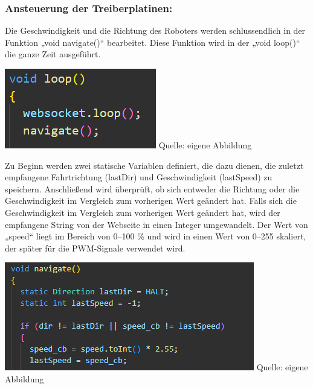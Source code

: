 \documentclass[ngerman,12pt,a4paper]{article}
\begin{document}
	\subsubsection{Ansteuerung der Treiberplatinen:}
	Die Geschwindigkeit und die Richtung des Roboters werden schlussendlich in der Funktion „void navigate()“ bearbeitet. Diese Funktion wird in der „void loop()“ die ganze Zeit ausgeführt. \\[0.5cm]
	\begin{minipage}{\textwidth}
		\centering
		\includegraphics[scale=0.9]{Pictures/code_loop_motoren}
		\label{fig:code_loop_motoren}
		\vspace{-2pt}
		\small Quelle: eigene Abbildung
	\end{minipage}
	Zu Beginn werden zwei statische Variablen definiert, die dazu dienen, die zuletzt empfangene Fahrtrichtung (lastDir) und Geschwindigkeit (lastSpeed) zu speichern. Anschließend wird überprüft, ob sich entweder die Richtung oder die Geschwindigkeit im Vergleich zum vorherigen Wert geändert hat. Falls sich die Geschwindigkeit im Vergleich zum vorherigen Wert geändert hat, wird der empfangene String von der Webseite in einen Integer umgewandelt. Der Wert von „speed“ liegt im Bereich von 0–100 \% und wird in einen Wert von 0–255 skaliert, der später für die PWM-Signale verwendet wird. \\[0.5cm]
	\begin{minipage}{\textwidth}
		\centering
		\includegraphics[scale=1.2]{Pictures/code_navigate_speed_umwandeln_motoren}
		\label{fig:code_navigate_speed_umwandeln_motoren}
		\vspace{-2pt}
		\small Quelle: eigene Abbildung
		\vspace{10pt}
	\end{minipage}
\end{document}
